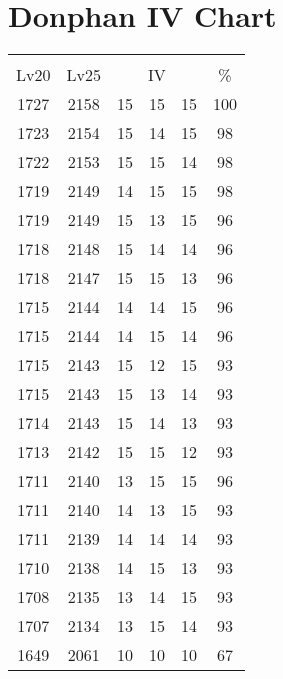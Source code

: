 \documentclass{article}%
\begin{document}
%
\normalsize%
\section{Donphan IV Chart}%
\label{sec:Donphan IV Chart}%
\renewcommand{\arraystretch}{1.5}%
\begin{tabular}{|c|c|c|c|c|c|}%
\hline%
\multicolumn{6}{|c|}{\textcolor{white}{ 
\linebreak{Donphan}
}%
\cellcolor{black}}\\%
\multicolumn{1}{|c}{Lv20}&\multicolumn{1}{c|}{Lv25}&\multicolumn{3}{c|}{IV}&\multicolumn{1}{|c|}{\%}\\%
\hline%
\rowcolor{color100}%
1727&2158&15&15&15&100\\%
\hline%
\rowcolor{color98}%
1723&2154&15&14&15&98\\%
\hline%
\rowcolor{color98}%
1722&2153&15&15&14&98\\%
\hline%
\rowcolor{color98}%
1719&2149&14&15&15&98\\%
\hline%
\rowcolor{color96}%
1719&2149&15&13&15&96\\%
\hline%
\rowcolor{color96}%
1718&2148&15&14&14&96\\%
\hline%
\rowcolor{color96}%
1718&2147&15&15&13&96\\%
\hline%
\rowcolor{color96}%
1715&2144&14&14&15&96\\%
\hline%
\rowcolor{color96}%
1715&2144&14&15&14&96\\%
\hline%
\rowcolor{color93}%
1715&2143&15&12&15&93\\%
\hline%
\rowcolor{color93}%
1715&2143&15&13&14&93\\%
\hline%
\rowcolor{color93}%
1714&2143&15&14&13&93\\%
\hline%
\rowcolor{color93}%
1713&2142&15&15&12&93\\%
\hline%
\rowcolor{color96}%
1711&2140&13&15&15&96\\%
\hline%
\rowcolor{color93}%
1711&2140&14&13&15&93\\%
\hline%
\rowcolor{color93}%
1711&2139&14&14&14&93\\%
\hline%
\rowcolor{color93}%
1710&2138&14&15&13&93\\%
\hline%
\rowcolor{color93}%
1708&2135&13&14&15&93\\%
\hline%
\rowcolor{color93}%
1707&2134&13&15&14&93\\%
\hline%
\rowcolor{color91}%
1649&2061&10&10&10&67\\%
\end{tabular}

%
\end{document}
